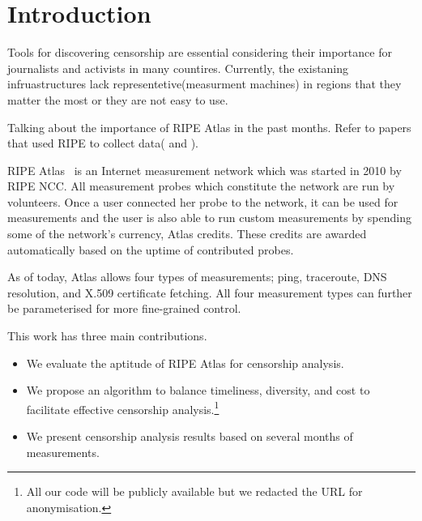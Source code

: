 \section{Introduction}

Tools for discovering censorship are essential considering their importance for journalists and
activists in many countires. Currently, the existaning infruastructures lack representetive(measurment machines) in
regions that they matter the most or they are not easy to use. 

Talking about the importance of RIPE Atlas in the past months. Refer to papers that used RIPE to collect data(\cite{lutu2014understanding} and \cite{brownlee2014searching}).


RIPE Atlas~\cite{atlas} is an Internet measurement network which was started in 2010 by RIPE NCC.
All measurement probes which constitute the network are run by volunteers.  Once a user connected
her probe to the network, it can be used for measurements and the user is also able to run custom
measurements by spending some of the network's currency, Atlas credits.  These credits are awarded
automatically based on the uptime of contributed probes.

As of today, Atlas allows four types of measurements; ping, traceroute, DNS resolution, and X.509
certificate fetching.  All four measurement types can further be parameterised for more fine-grained
control.

This work has three main contributions.
\begin{itemize}
	\item We evaluate the aptitude of RIPE Atlas for censorship analysis.
	\item We propose an algorithm to balance
	timeliness, diversity, and cost to facilitate effective censorship analysis.\footnote{All our
	code will be publicly available but we redacted the URL for anonymisation.}
	\item We present censorship analysis results based on several months of measurements.
\end{itemize}
